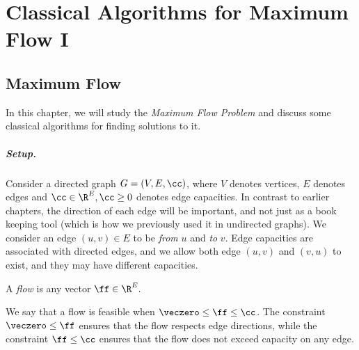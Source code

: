 \chapter{Classical
  Algorithms for Maximum Flow I}
\label{cha:maxflow1}
%
%


%

\sloppy
\section{Maximum Flow}
In this chapter, we will study the \emph{Maximum Flow Problem} and
    discuss some classical algorithms for finding solutions to it.
% 
\paragraph{Setup.} Consider a directed graph \(G=(V, E, \cc)\), where
$V$ denotes vertices, $E$ denotes edges and $\cc \in \R^{E},  \cc \geq 0$ denotes edge
capacities. In contrast to earlier chapters, the direction
of each edge will be important, and not just as a book keeping tool
(which is how we previously used it in undirected graphs).
We consider an edge $(u,v) \in E$ to be \emph{from} $u$ and \emph{to}
$v$.
Edge capacities are associated with directed edges, and we allow both
edge $(u,v)$ and $(v,u)$ to exist, and they may have different
capacities.

A \emph{flow} is any vector $\ff \in \R^E.$

We say that a flow is feasible
when $\veczero \leq \ff \leq \cc$.
The constraint $\veczero \leq \ff$ ensures that the flow respects edge
directions, while the constraint $\ff \leq \cc$ ensures that the flow
does not exceed capacity on any edge.

